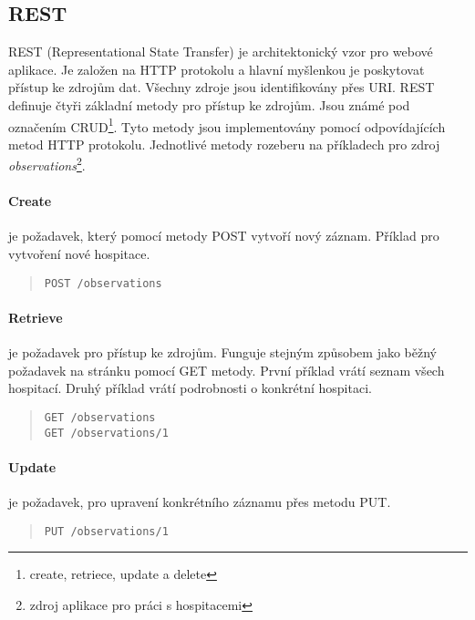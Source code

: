 \subsection{REST}
\label{rest}
REST (Representational State Transfer) \cite{rest} je architektonický vzor pro webové aplikace. Je založen na HTTP protokolu a hlavní myšlenkou je poskytovat přístup ke zdrojům dat. Všechny zdroje jsou identifikovány přes URI. REST definuje čtyři základní metody pro přístup ke zdrojům. Jsou známé pod označením CRUD\footnote{create, retriece, update a delete}. Tyto metody jsou implementovány pomocí odpovídajících metod HTTP protokolu. Jednotlivé metody rozeberu na příkladech pro zdroj \textit{observations}\footnote{zdroj aplikace pro práci s hospitacemi}.

\paragraph*{Create}
je požadavek, který pomocí metody POST vytvoří nový záznam. Příklad pro vytvoření nové hospitace.

\begin{quote}
\begin{verbatim}
POST /observations
\end{verbatim} 
\end{quote}

\paragraph*{Retrieve}
je požadavek pro přístup ke zdrojům. Funguje stejným způsobem jako běžný požadavek na stránku pomocí GET metody. První příklad vrátí seznam všech hospitací. Druhý příklad vrátí podrobnosti o konkrétní hospitaci.

\begin{quote}
\begin{verbatim}
GET /observations
GET /observations/1
\end{verbatim} 
\end{quote}
 
\paragraph*{Update}
je požadavek, pro upravení konkrétního záznamu přes metodu PUT. 

\begin{quote}
\begin{verbatim}
PUT /observations/1
\end{verbatim} 
\end{quote}

